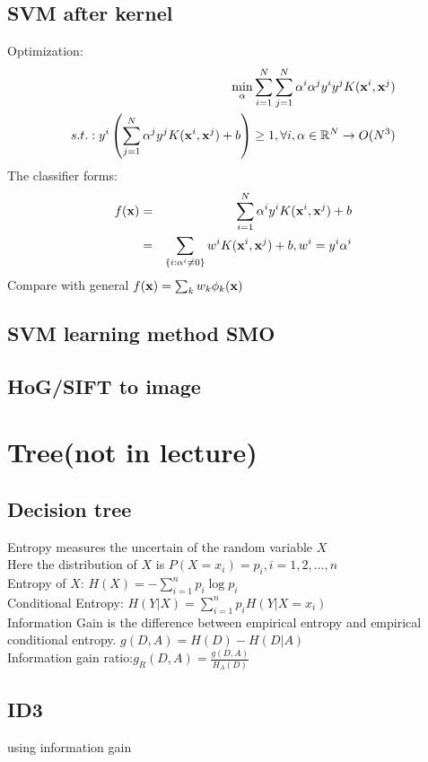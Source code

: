 \documentclass[12pt,a4paper]{article}
\begin{document}
\subsection*{SVM after kernel}
Optimization:
\begin{eqnarray*}
\min_\alpha\sum_{i=1}^N\sum_{j=1}^N\alpha^i\alpha^jy^iy^jK({\bf x}^i,{\bf x}^j)\\
s.t.: y^i\left(\sum_{j=1}^N\alpha^jy^jK({\bf x}^i,{\bf x}^j)+b\right)\ge 1, \forall i, {\bf \alpha}\in \mathbb{R}^N\rightarrow O(N^3)
\end{eqnarray*}
The classifier forms:
\begin{eqnarray*}
f({\bf x}) &=& \sum_{i=1}^N\alpha^iy^iK({\bf x}^i,{\bf x}^j)+b\\
&=& \sum_{\{i:\alpha^i\ne0\}}w^iK({\bf x}^i,{\bf x}^j)+b, w^i = y^i\alpha^i
\end{eqnarray*}
Compare with general $f({\bf x}) = \sum_kw_k\phi_k({\bf x})$


\subsection*{SVM learning method SMO}

\subsection*{HoG/SIFT to image}




\section*{Tree(not in lecture)}
\subsection*{Decision tree}
Entropy measures the uncertain of the random variable $X$\\
Here the distribution of $X$ is $P(X=x_i)=p_i, i=1,2,\ldots,n$ \\
Entropy of $X$: $H(X) = -\sum_{i=1}^{n}p_i\log p_i$ \\
Conditional Entropy: $H(Y|X)=\sum_{i=1}^{n}p_iH(Y|X=x_i)$ \\
Information Gain is the difference between empirical entropy and empirical conditional entropy.
$g(D,A) = H(D)-H(D|A)$\\
Information gain ratio:$g_R(D,A)=\frac{g(D,A)}{H_A(D)}$
\subsection*{ID3}
using information gain
\end{document}
